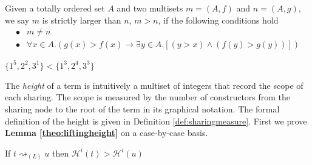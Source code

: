 \documentclass[a4paper,UKenglish,cleveref, autoref]{lipics-v2019}
\newcommand{\set}[1]{ \{ #1 \} }
\newcommand{\height}[2]{\mathcal{H}^{#1}(#2)}
\begin{document}
\begin{definition} Given a totally ordered set $A$ and two multisets $m = (A, f)$ and $n = (A, g)$, we say $m$ is strictly larger than $n$, $m > n$, if the following conditions hold
\begin{align*}
	\bullet & m \neq n \\
	\bullet & \forall x \in A. (g(x) > f(x) \rightarrow \exists y \in A.[ (y > x) \wedge (f(y) > g(y))] )
\end{align*}
\end{definition}

\begin{example}
$\set{1^{5}, 2^{2}, 3^{1}} < \set{1^{3}, 2^{4}, 3^{3}}$
\end{example}

The \emph{height} of a term is intuitively a multiset of integers that record the scope of each sharing. The scope is measured by the number of constructors from the sharing node to the root of the term in its graphical notation. The formal definition of the height is given in Definition \ref{def:sharingmeasure}. First we prove {\bf Lemma \ref{theo:liftingheight}} on a case-by-case basis.

If $t \rightsquigarrow_{(L)} u$ then $\height{i}{t} > \height{i}{u}$
\end{document}
